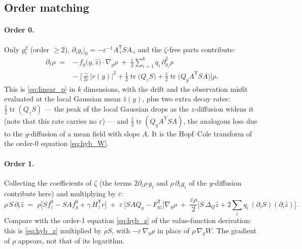 \documentclass[11pt,a4paper]{article}
\newcommand{\tr}{\operatorname{tr}}
\newcommand{\T}{^{\mathsf T}}
\newcommand{\zh}{\hat{z}}
\newcommand{\eps}{\varepsilon}
\newcommand{\abs}[1]{\left\lvert #1 \right\rvert}
\newcommand{\gy}{\nabla_{\!y}}
\theoremstyle{plain}
\theoremstyle{definition}
\theoremstyle{remark}
\begin{document}
\subsection{Order matching}

\paragraph{Order 0.}
Only $g_i^2$ (order $\ge2$), $\partial_ig_i|_0 = -\eps^{-1}A_{\cdot i}\T SA_{\cdot i}$ and the $\zeta$-free parts contribute:
\begin{equation}
  \boxed{\;
  \begin{aligned}
  \partial_t\rho \;={}& -\,f_y\big(y,\zh\big)\cdot\gy\rho \;+\; \frac{\eps}{2}\sum_{i=1}^{k} q_i\,\partial_{y_i}^2\rho \\
  &-\; \Big[\,\frac{\gamma}{2\eps}\,\abs{r(y)}^2 + \frac12\tr\big(Q_zS\big) + \frac12\tr\big(Q_yA\T SA\big)\Big]\rho .
  \end{aligned}\;}
  \label{eq:hyb_rho}
\end{equation}
This is \eqref{eq:linear_p} in $k$ dimensions, with the drift and the observation misfit evaluated at the local Gaussian mean $\zh(y)$, plus two extra decay rates: $\tfrac12\tr(Q_zS)$ --- the peak of the local Gaussian drops as the $z$-diffusion widens it (note that this rate carries no $\eps$) --- and $\tfrac12\tr(Q_yA\T SA)$, the analogous loss due to the $y$-diffusion of a mean field with slope $A$. It is the Hopf--Cole transform of the order-0 equation \eqref{eq:hyb_W}.

\paragraph{Order 1.}
Collecting the coefficients of $\zeta$ (the terms $2\partial_i\rho\,g_i$ and $\rho\,\partial_ig_i$ of the $y$-diffusion contribute here) and multiplying by $\eps$:
\begin{equation}
  \rho\,S\,\partial_t\zh \;=\; \rho\Big[S f_z^0 - SAf_y^0 + \gamma\,H_z\T r\Big]
  \;+\; \eps\,\big[SAQ_y - F_{yz}\T\big]\gy\rho
  \;+\; \frac{\eps\rho}{2}\Big[S\,\Delta_Q\zh + 2\sum_i q_i\,(\partial_iS)(\partial_i\zh)\Big].
  \label{eq:p_order1}
\end{equation}
Compare with the order-1 equation \eqref{eq:hyb_z} of the value-function derivation: this is \eqref{eq:hyb_z} multiplied by $\rho S$, with $-\eps\,\gy\rho$ in place of $\rho\,\gy W$. The gradient of $\rho$ appears, not that of its logarithm.
\end{document}
